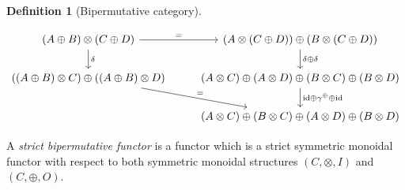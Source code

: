 \documentclass[a4paper]{article}
\theoremstyle{plain}
\theoremstyle{definition}
\newtheorem{definition}[theorem]{Definition}
\newcommand{\symplus}{\gamma^\oplus}
\newcommand{\iid}{\mathrm{id}}
\begin{document}
\begin{definition}[Bipermutative category]
\begin{itemize}
			\begin{equation}\label{eq:biper-coh}
				\begin{tikzcd}
					(A \oplus B) \otimes (C \oplus D) & (A \otimes (C \oplus D)) \oplus (B \otimes (C \oplus D)) \\
					((A \oplus B) \otimes C) \oplus ((A \oplus B) \otimes D) & (A
					\otimes C) \oplus (A \otimes D) \oplus (B \otimes C) \oplus (B
					\otimes D) \\
					& (A \otimes C) \oplus (B \otimes C) \oplus (A \otimes D) \oplus (B \otimes D)
					\arrow["=", from=1-1, to=1-2]
					\arrow["\delta", from=1-1, to=2-1]
					\arrow["\delta \oplus \delta", from=1-2, to=2-2]
					\arrow["=", from=2-1, to=3-2]
					\arrow["\iid \oplus \symplus \oplus \iid", from=2-2, to=3-2]
				\end{tikzcd}
			\end{equation}
	\end{itemize}
	A \emph{strict bipermutative functor} is a functor which is a strict symmetric
	monoidal functor with respect to both symmetric monoidal structures $(C,
	\otimes, I)$ and $(C, \oplus, O)$.
\end{definition}
\end{document}
